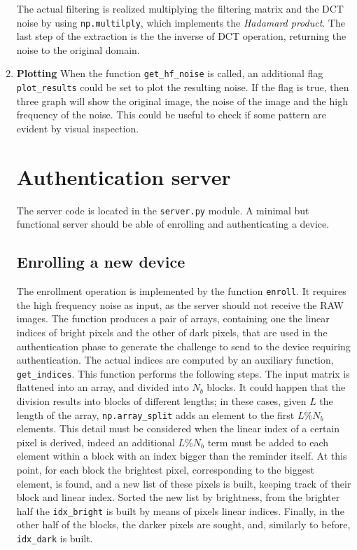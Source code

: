 \begin{enumerate}
        The actual filtering is realized multiplying the filtering matrix and the DCT noise by using \texttt{np.multilply}, which implements the \emph{Hadamard product}. The last step of the extraction is the the inverse of DCT operation, returning the noise to the original domain.
  \item \textbf{Plotting}
        When the function \texttt{get\_hf\_noise} is called, an additional flag \texttt{plot\_results} could be set to plot the resulting noise. If the flag is true, then three graph will show the original image, the noise of the image and the high frequency of the noise. This could be useful to check if some pattern are evident by visual inspection.

        \section{Authentication server}\label{sec:authserver}
        The server code is located in the \texttt{server.py} module. A minimal but functional server should be able of enrolling and authenticating a device.

        \subsection{Enrolling a new device}\label{subsec:enrollment}
        The enrollment operation is implemented by the function \texttt{enroll}. It requires the high frequency noise as input, as the server should not receive the RAW images. The function produces a pair of arrays, containing one the linear indices of bright pixels and the other of dark pixels, that are used in the authentication phase to generate the challenge to send to the device requiring authentication.
        The actual indices are computed by an auxiliary function, \texttt{get\_indices}. This function performs the following steps. The input matrix is flattened into an array, and divided into $N_{b}$ blocks.
        It could happen that the division results into blocks of different lengths; in these cases, given $L$ the length of the array, \texttt{np.array\_split} adds an element to the first $L \% N_{b}$ elements. This detail must be considered when the linear index of a certain pixel is derived, indeed an additional $L \% N_{b}$ term must be added to each element within a block with an index bigger than the reminder itself.
        At this point, for each block the brightest pixel, corresponding to the biggest element, is found, and a new list of these pixels is built, keeping track of their block and linear index.
        Sorted the new list by brightness, from the brighter half the \texttt{idx\_bright}
        is built by means of pixels linear indices. Finally, in the other half of the blocks, the darker pixels are sought, and, similarly to before, \texttt{idx\_dark} is built.


\end{enumerate}
